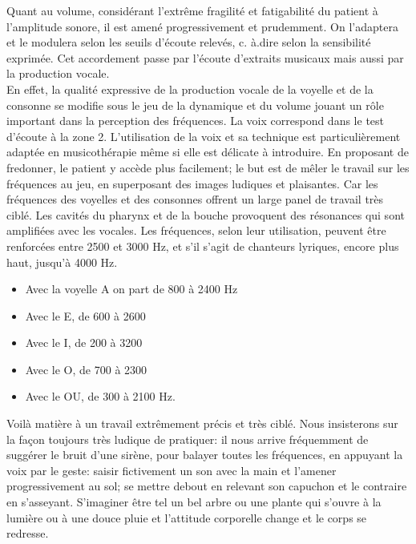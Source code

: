 
Quant au volume, considérant l'extrême fragilité et fatigabilité du patient à l'amplitude sonore, 
il est amené progressivement et prudemment.
On l'adaptera et le modulera selon 
les seuils 
d'écoute relevés, c. à.dire selon la sensibilité exprimée.
Cet accordement passe par l'écoute d'extraits musicaux mais aussi par  la production vocale.
 \\
En effet, la qualité expressive de la production vocale de la voyelle et de la consonne se modifie sous le 
jeu de la 
dynamique et du volume  jouant  un rôle important dans la perception des fréquences.
La voix correspond dans le test d'écoute à la zone 2.  L'utilisation de la voix et sa 
technique est particulièrement adaptée en 
musicothérapie même si elle est délicate à  introduire. %
 En proposant de fredonner, le patient y accède plus 
 facilement;  le but est de mêler le travail sur les fréquences au jeu, en superposant  des images 
 ludiques et plaisantes. Car les fréquences des voyelles et des consonnes offrent un large panel de 
 travail très ciblé. Les cavités du 
pharynx et de la bouche provoquent des résonances qui sont amplifiées avec les vocales. Les 
fréquences, selon leur utilisation, peuvent être renforcées entre 2500 et 3000 Hz, et s'il s'agit de 
chanteurs lyriques, encore plus haut, jusqu'à 4000 Hz. %
\autocite {Barraque} 
\begin{itemize}
	\item Avec la voyelle A on part de 800  à 2400 Hz
	\item Avec le  E, de 600 à 2600
	\item Avec le I, de 200 à 3200
	\item Avec le O, de 700 à 2300 
	\item Avec le OU, de 300 à 2100 Hz. 
\end{itemize}
Voilà matière à un travail extrêmement précis et très ciblé. 
Nous insisterons  sur la façon  toujours très ludique de pratiquer:  il nous arrive fréquemment 
de suggérer le bruit d'une sirène, pour balayer toutes les fréquences, en appuyant la voix par le geste: 
saisir fictivement un son avec la main et l'amener progressivement au sol;  se mettre debout en relevant 
son 
capuchon et le 
contraire en s'asseyant. S'imaginer être tel un bel 
arbre ou une plante qui s'ouvre à la lumière ou à une douce pluie et l'attitude corporelle change et le 
corps se redresse.
